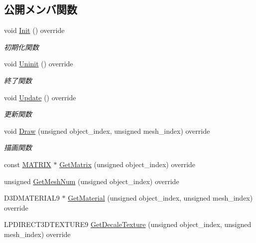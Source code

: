 \subsection*{公開メンバ関数}
\begin{DoxyCompactItemize}
\item 
void \mbox{\hyperlink{class_tutorial_logo_draw_a53fc4b1b23c7f9e249600be67510f944}{Init}} () override
\begin{DoxyCompactList}\small\item\em 初期化関数 \end{DoxyCompactList}\item 
void \mbox{\hyperlink{class_tutorial_logo_draw_a949fb70954e3df28f87b8ed5c61bf8f1}{Uninit}} () override
\begin{DoxyCompactList}\small\item\em 終了関数 \end{DoxyCompactList}\item 
void \mbox{\hyperlink{class_tutorial_logo_draw_af69405fcc8b20684a19e982726d93ffa}{Update}} () override
\begin{DoxyCompactList}\small\item\em 更新関数 \end{DoxyCompactList}\item 
void \mbox{\hyperlink{class_tutorial_logo_draw_aa808cfb8bc59d58bbd698a195603429f}{Draw}} (unsigned object\+\_\+index, unsigned mesh\+\_\+index) override
\begin{DoxyCompactList}\small\item\em 描画関数 \end{DoxyCompactList}\item 
const \mbox{\hyperlink{_vector3_d_8h_a032295cd9fb1b711757c90667278e744}{M\+A\+T\+R\+IX}} $\ast$ \mbox{\hyperlink{class_tutorial_logo_draw_ab700e592d00574dff6ee342138343d7b}{Get\+Matrix}} (unsigned object\+\_\+index) override
\item 
unsigned \mbox{\hyperlink{class_tutorial_logo_draw_a19de254c5460e3728d7c79243fd65e6f}{Get\+Mesh\+Num}} (unsigned object\+\_\+index) override
\item 
D3\+D\+M\+A\+T\+E\+R\+I\+A\+L9 $\ast$ \mbox{\hyperlink{class_tutorial_logo_draw_a3a97860361e32a727246e99052715f37}{Get\+Material}} (unsigned object\+\_\+index, unsigned mesh\+\_\+index) override
\item 
L\+P\+D\+I\+R\+E\+C\+T3\+D\+T\+E\+X\+T\+U\+R\+E9 \mbox{\hyperlink{class_tutorial_logo_draw_ad9df98aa8a5b11872dba6f6609589035}{Get\+Decale\+Texture}} (unsigned object\+\_\+index, unsigned mesh\+\_\+index) override
\end{DoxyCompactItemize}
